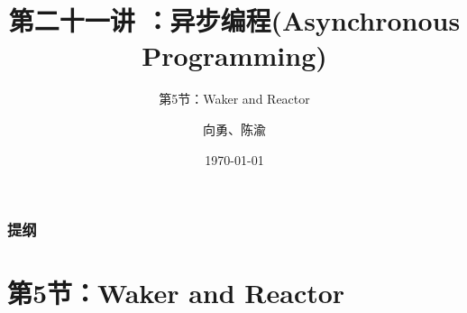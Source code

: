 


\title[第21讲]{第二十一讲 ：异步编程(Asynchronous Programming)} %
\subtitle{第5节：Waker and Reactor}
\author{向勇、陈渝} %
\date{\today} %



\begin{frame}
\titlepage %
\end{frame}

\begin{frame}
\frametitle{提纲} %
\tableofcontents %

\end{frame}
\section{第5节：Waker and Reactor} %
